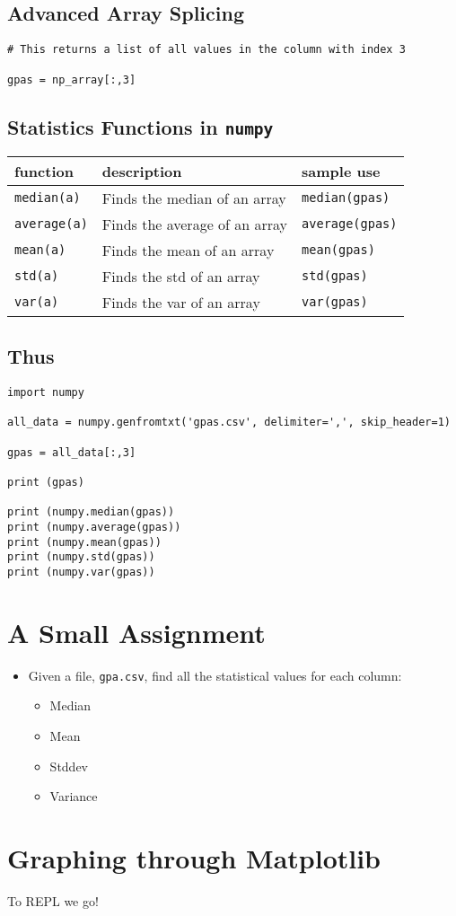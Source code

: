 \documentclass[11pt]{article}
\begin{document}
\subsection{Advanced Array Splicing}
\label{sec:orgf1138de}
\begin{verbatim}
# This returns a list of all values in the column with index 3

gpas = np_array[:,3]  
\end{verbatim}
\subsection{Statistics Functions in \texttt{numpy}}
\label{sec:org284875d}
\begin{center}
\begin{tabular}{lll}
function & description & sample use\\
\hline
\texttt{median(a)} & Finds the median of an array & \texttt{median(gpas)}\\
\texttt{average(a)} & Finds the average of an array & \texttt{average(gpas)}\\
\texttt{mean(a)} & Finds the mean of an array & \texttt{mean(gpas)}\\
\texttt{std(a)} & Finds the std of an array & \texttt{std(gpas)}\\
\texttt{var(a)} & Finds the var of an array & \texttt{var(gpas)}\\
\end{tabular}
\end{center}

\subsection{Thus}
\label{sec:org04a97a5}
\begin{verbatim}
import numpy

all_data = numpy.genfromtxt('gpas.csv', delimiter=',', skip_header=1)

gpas = all_data[:,3]

print (gpas)

print (numpy.median(gpas))
print (numpy.average(gpas))
print (numpy.mean(gpas))
print (numpy.std(gpas))
print (numpy.var(gpas))
\end{verbatim}
\section{A Small Assignment}
\label{sec:orgdd9744e}
\begin{itemize}
\item Given a file, \texttt{gpa.csv}, find all the statistical values for each column:
\begin{itemize}
\item Median
\item Mean
\item Stddev
\item Variance
\end{itemize}
\end{itemize}
\section{Graphing through Matplotlib}
\label{sec:orgc546a84}
To REPL we go!
\end{document}
